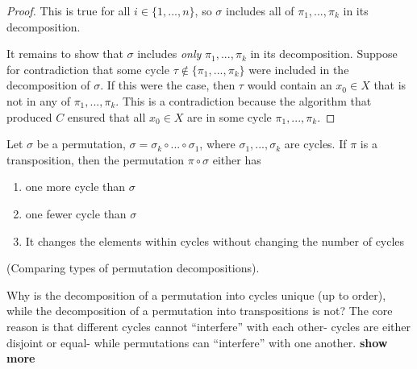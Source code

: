 \begin{proof}
    This is true for all $i \in \{1, ..., n\}$, so $\sigma$ includes all of $\pi_1, ..., \pi_k$ in its decomposition.

    It remains to show that $\sigma$ includes \textit{only} $\pi_1, ..., \pi_k$ in its decomposition. Suppose for contradiction that some cycle $\tau \notin \{\pi_1, ..., \pi_k\}$ were included in the decomposition of $\sigma$. If this were the case, then $\tau$ would contain an $x_0 \in X$ that is not in any of $\pi_1, ..., \pi_k$. This is a contradiction because the algorithm that produced $C$ ensured that all $x_0 \in X$ are in some cycle $\pi_1, ..., \pi_k$.
\end{proof}

\begin{lemma}
    Let $\sigma$ be a permutation, $\sigma = \sigma_k \circ ... \circ \sigma_1$, where $\sigma_1, ..., \sigma_k$ are cycles. If $\pi$ is a transposition, then the permutation $\pi \circ \sigma$ either has

    \begin{enumerate}
        \item one more cycle than $\sigma$
        \item one fewer cycle than $\sigma$
        \item It changes the elements within cycles without changing the number of cycles
    \end{enumerate}
\end{lemma}

\begin{remark}
    (Comparing types of permutation decompositions).
    
    Why is the decomposition of a permutation into cycles unique (up to order), while the decomposition of a permutation into transpositions is not? The core reason is that different cycles cannot ``interfere'' with each other- cycles are either disjoint or equal- while permutations can ``interfere'' with one another. \textbf{show more}
\end{remark}


